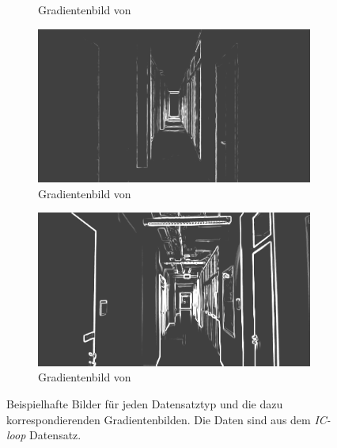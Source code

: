\begin{figure}
\begin{subfigure}[t]{0.24\linewidth}
		\caption{Gradientenbild  \hspace{1cm} von }
	\end{subfigure}
	\hfill
	\begin{subfigure}[t]{0.24\linewidth}
		\centering
		\includegraphics[width=\linewidth]{images/syn_dataset/cg00708.png}
		\caption{Gradientenbild  \hspace{1cm} von }
	\end{subfigure}
	\hfill
	\begin{subfigure}[t]{0.24\linewidth}
		\centering
		\includegraphics[width=\linewidth]{images/syn_dataset/rg000305.png}
		\caption{Gradientenbild  \hspace{1cm} von }
	\end{subfigure}
	\hfill
	\caption{Beispielhafte Bilder für jeden Datensatztyp und die dazu korrespondierenden Gradientenbilden. Die Daten sind aus dem \textit{IC-loop} Datensatz.}
	\label{fig:dataset_preprocess}
\end{figure}

\cleardoublepage

